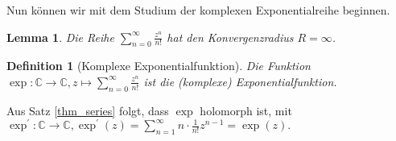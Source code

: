 \documentclass[a4paper,12pt]{book}
\theoremstyle{newthm}
\newtheorem{lem}[thm]{Lemma}
\theoremstyle{newdef}
\newtheorem{defn}[thm]{Definition}
\theoremstyle{newrem}
\newcommand{\C}{\mathbb{C}}
\begin{document}
		Nun können wir mit dem Studium der komplexen Exponentialreihe beginnen.
		
		\begin{lem}
			Die Reihe $ \sum\limits_{n=0}^\infty \frac{z^n}{n!} $ hat den Konvergenzradius $ R = \infty $.
		\end{lem}
		
		\begin{defn}[Komplexe Exponentialfunktion]
			Die Funktion $ \exp: \C \to \C, z \mapsto \sum\limits_{n=0}^\infty \frac{z^n}{n!} $ ist die \emph{(komplexe) Exponentialfunktion}.
		\end{defn}
		
		Aus Satz \ref{thm_series} folgt, dass $\exp$ holomorph ist, mit $ \exp^\prime:\C \to \C, \exp^\prime(z) = \sum\limits_{n=1}^\infty n \cdot \frac{1}{n!} z^{n-1} = \exp(z). $\\
		
\end{document}
